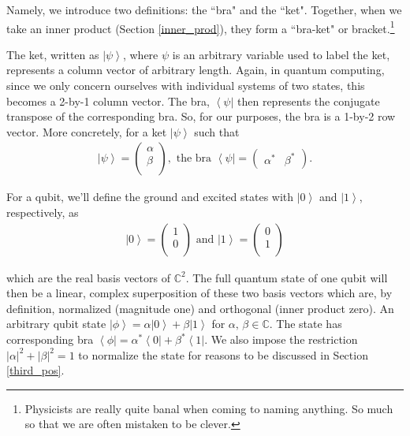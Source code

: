 \documentclass[11pt]{article} %
\newcommand{\bra}[1]{\left\langle #1 \right|}
\newcommand{\ket}[1]{\left|#1\right\rangle}
\begin{document}
Namely, we introduce two definitions: the ``bra" and the ``ket". Together, when we take an inner product (Section \ref{inner_prod}), they form a ``bra-ket" or bracket.\footnote{Physicists are really quite banal when coming to naming anything. So much so that we are often mistaken to be clever.}

The ket, written as $\ket{\psi}$, where $\psi$ is an arbitrary variable used to label the ket, represents a column vector of arbitrary length. Again, in quantum computing, since we only concern ourselves with individual systems of two states, this becomes a 2-by-1 column vector. The bra, $\bra{\psi}$ then represents the conjugate transpose of the corresponding bra. So, for our purposes, the bra is a 1-by-2 row vector. More concretely, for a ket $\ket{\psi}$ such that
\begin{align}
    \ket{\psi} = 
    \begin{pmatrix}
        \alpha \\
        \beta \\
    \end{pmatrix},
    \textrm{ the bra }
    \bra{\psi} = 
    \begin{pmatrix}
        \alpha^\ast & \beta^\ast
    \end{pmatrix}. \nonumber
\end{align}

For a qubit, we'll define the ground and excited states with $\ket{0}$ and $\ket{1}$, respectively, as
\begin{align}
    \ket{0} = 
    \begin{pmatrix}
        1 \\
        0 \\
    \end{pmatrix}
    \textrm{ and }
    \ket{1} = 
    \begin{pmatrix}
        0 \\
        1 \\
    \end{pmatrix} \nonumber
\end{align}

\noindent which are the real basis vectors of $\mathbb{C}^2$. The full quantum state of one qubit will then be a linear, complex superposition of these two basis vectors which are, by definition, normalized (magnitude one) and orthogonal (inner product zero). An arbitrary qubit state $\ket{\phi} = \alpha\ket{0} + \beta\ket{1}$ for $\alpha,\,\beta \in \mathbb{C}$. The state has corresponding bra $\bra{\phi} = \alpha^\ast\bra{0} + \beta^\ast\bra{1}$. We also impose the restriction $\left|\alpha\right|^2 + \left|\beta\right|^2 = 1$ to normalize the state for reasons to be discussed in Section \ref{third_pos}.
\end{document}
